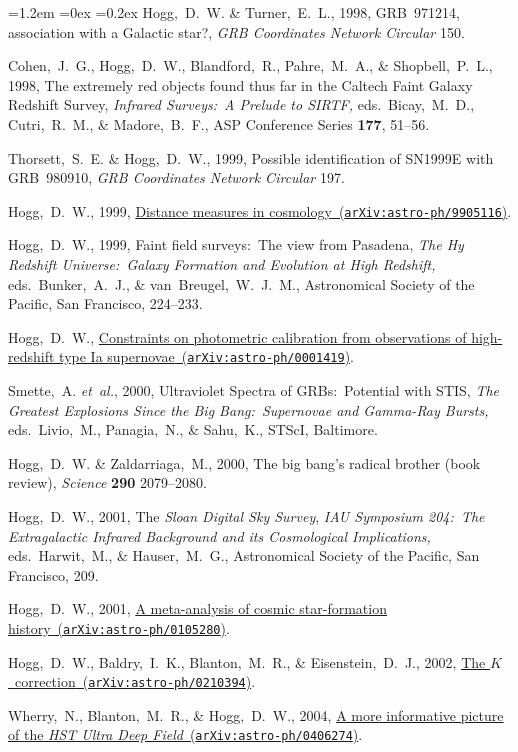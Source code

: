 \documentclass[10pt,letterpaper]{article}
\newcommand{\acronym}[1]{{\small{#1}}}
\newcommand{\foreign}[1]{\textsl{#1}}
\newcommand{\etal}{\foreign{et~al.}}
\newcommand{\project}[1]{\textsl{#1}}
\newcommand{\arxiv}[2]{\href{http://arxiv.org/abs/#1}{{#2}\ (\texttt{arXiv:#1})}}
\newcounter{refpubnum}
\newcommand{\hogglist}{%
    \rightmargin=0in
    \leftmargin=1.2em
    \topsep=0ex
    \partopsep=0pt
    \itemsep=0.2ex
    \parsep=0pt
    \itemindent=-1.0\leftmargin
    \listparindent=0.0\leftmargin
    \settowidth{\labelsep}{~}
    \usecounter{refpubnum}
  }
\begin{document}
\begin{list}{}{\hogglist}
Hogg,~D.~W. \& Turner,~E.~L., 1998,
{\acronym{GRB}~971214, association with a Galactic star?},
\textit{\acronym{GRB} Coordinates Network Circular} 150.
\item
Cohen,~J.~G., Hogg,~D.~W., Blandford,~R., Pahre,~M.~A., \& Shopbell,~P.~L., 1998,
{The extremely red objects found thus far in the Caltech Faint Galaxy Redshift Survey},
\textit{Infrared Surveys:\ A Prelude to SIRTF,} eds.\ Bicay,~M.~D., Cutri,~R.~M., \& Madore,~B.~F.,
ASP Conference Series \textbf{177}, 51--56.
\item
Thorsett,~S.~E. \& Hogg,~D.~W., 1999,
{Possible identification of SN1999E with \acronym{GRB}~980910},
\textit{\acronym{GRB} Coordinates Network Circular} 197.
\item
Hogg,~D.~W., 1999,
\arxiv{astro-ph/9905116}{Distance measures in cosmology}.
\item
Hogg,~D.~W., 1999,
{Faint field surveys:\ The view from Pasadena},
\textit{The Hy Redshift Universe:\ Galaxy Formation and Evolution at
High Redshift,} eds.\ Bunker,~A.~J., \& van~Breugel,~W.~J.~M.,
Astronomical Society of the Pacific, San Francisco, 224--233.
\item
Hogg,~D.~W.,
\arxiv{astro-ph/0001419}{Constraints on photometric calibration from observations of high-redshift type Ia supernovae}.
\item
Smette,~A. \etal, 2000,
{Ultraviolet Spectra of \acronym{GRB}s:\ Potential with
\acronym{STIS}},
\textit{The Greatest Explosions Since the Big Bang:\ Supernovae
and Gamma-Ray Bursts,} eds.\ Livio,~M., Panagia,~N., \& Sahu,~K.,
STScI, Baltimore.
\item
Hogg,~D.~W. \& Zaldarriaga,~M., 2000,
{The big bang's radical brother
(book review)},
\textit{Science} \textbf{290} 2079--2080.
\item
Hogg,~D.~W., 2001,
{The \project{Sloan Digital Sky Survey}},
\textit{IAU Symposium 204:\ The Extragalactic Infrared Background and
its Cosmological Implications,} eds.\ Harwit,~M., \& Hauser,~M.~G.,
Astronomical Society of the Pacific, San Francisco, 209.
\item
Hogg,~D.~W., 2001,
\arxiv{astro-ph/0105280}{A meta-analysis of cosmic star-formation history}.
\item
Hogg,~D.~W., Baldry,~I.~K., Blanton,~M.~R., \& Eisenstein,~D.~J., 2002,
\arxiv{astro-ph/0210394}{The $K$~correction}.
\item
Wherry,~N., Blanton,~M.~R., \& Hogg,~D.~W., 2004,
\arxiv{astro-ph/0406274}{A more informative picture of the \project{\acronym{HST} Ultra Deep Field}}.
\item

\end{list}
\end{document}
